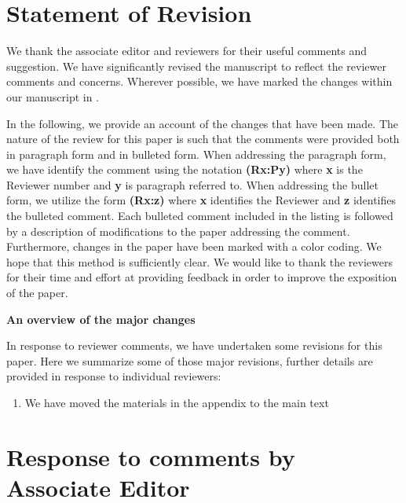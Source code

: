 \documentclass{letter}
\newcommand{\rr}[1]{{\bf \color{blue}{#1}}}
\begin{document}
\section{Statement of Revision}

We thank the associate editor and reviewers for their useful comments and suggestion. We have significantly revised the manuscript to reflect the reviewer comments and concerns. Wherever possible, we have marked the changes within our manuscript in \rr{blue}.

In the following, we provide an account of the changes that have been made.  The nature of the review for this paper is such that the comments were provided both in paragraph form and in bulleted form.  When addressing the paragraph form, we have identify the comment using the notation {\bf {\color{red}(Rx:Py)}} where {\bf x} is the Reviewer number and {\bf y} is paragraph referred to. When addressing the bullet form, we utilize the form {\bf (Rx:z)} where {\bf x} identifies the Reviewer and {\bf z} identifies the bulleted comment. Each bulleted comment included in the listing is followed by a description of modifications to the paper addressing the comment. Furthermore, changes in the paper have been marked with a color coding.  We hope that this method is sufficiently clear. We would like to thank the reviewers for their time and effort at providing feedback in order to improve the exposition of the paper.

\noindent\textbf{An overview of the major changes}

In response to reviewer comments, we have undertaken some revisions for this paper. Here we summarize some of those major revisions, further details are provided in response to individual reviewers:

\begin{enumerate}
\item We have moved the materials in the appendix to the main text
\end{enumerate}

\section{Response to comments by Associate Editor}
\end{document}
